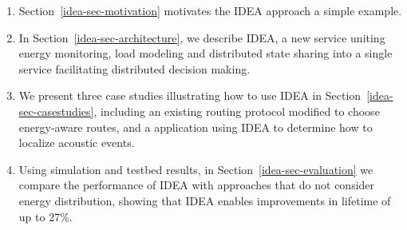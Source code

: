 \begin{enumerate}

\item Section~\ref{idea-sec-motivation} motivates the IDEA approach a simple
example.

\item In Section~\ref{idea-sec-architecture}, we describe IDEA, a new service
uniting energy monitoring, load modeling and distributed state sharing into a
single service facilitating distributed decision making.

\item We present three case studies illustrating how to use IDEA in
Section~\ref{idea-sec-casestudies}, including an existing routing protocol
modified to choose energy-aware routes, and a application using IDEA to
determine how to localize acoustic events.

\item Using simulation and testbed results, in
Section~\ref{idea-sec-evaluation} we compare the performance of IDEA with
approaches that do not consider energy distribution, showing that IDEA
enables improvements in lifetime of up to 27\%.

\end{enumerate}
